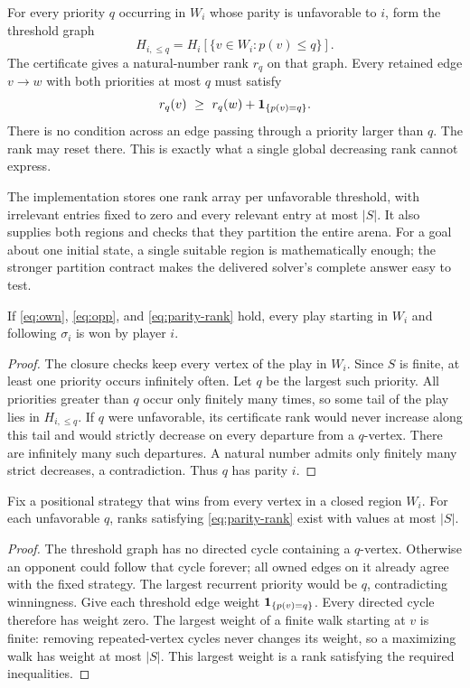 For every priority $q$ occurring in $W_i$ whose parity is unfavorable to $i$,
form the threshold graph
\[
 H_{i,\le q}=H_i[\{v\in W_i:p(v)\le q\}].
\]
The certificate gives a natural-number rank $r_q$ on that graph. Every retained
edge $v\to w$ with both priorities at most $q$ must satisfy
\begin{equation}
 r_q(v)\ \ge\ r_q(w)+\one{p(v)=q}.
 \label{eq:parity-rank}
\end{equation}
There is no condition across an edge passing through a priority larger than
$q$. The rank may reset there. This is exactly what a single global decreasing
rank cannot express.

The implementation stores one rank array per unfavorable threshold, with
irrelevant entries fixed to zero and every relevant entry at most $|S|$. It
also supplies both regions and checks that they partition the entire arena.
For a goal about one initial state, a single suitable region is mathematically
enough; the stronger partition contract makes the delivered solver's complete
answer easy to test.

\begin{theorem}
\label{thm:parity}
If \eqref{eq:own}, \eqref{eq:opp}, and \eqref{eq:parity-rank} hold, every play
starting in $W_i$ and following $\sigma_i$ is won by player $i$.
\end{theorem}
\begin{proof}
The closure checks keep every vertex of the play in $W_i$. Since $S$ is finite,
at least one priority occurs infinitely often. Let $q$ be the largest such
priority. All priorities greater than $q$ occur only finitely many times, so
some tail of the play lies in $H_{i,\le q}$. If $q$ were unfavorable, its
certificate rank would never increase along this tail and would strictly
decrease on every departure from a $q$-vertex. There are infinitely many such
departures. A natural number admits only finitely many strict decreases, a
contradiction. Thus $q$ has parity $i$.
\end{proof}

\begin{proposition}
\label{prop:rank-complete}
Fix a positional strategy that wins from every vertex in a closed region $W_i$.
For each unfavorable $q$, ranks satisfying \eqref{eq:parity-rank} exist with
values at most $|S|$.
\end{proposition}
\begin{proof}
The threshold graph has no directed cycle containing a $q$-vertex. Otherwise
an opponent could follow that cycle forever; all owned edges on it already
agree with the fixed strategy. The largest recurrent priority would be $q$,
contradicting winningness. Give each threshold edge weight
$\mathbf{1}_{\{p(v)=q\}}$. Every directed cycle therefore has weight zero. The largest
weight of a finite walk starting at $v$ is finite: removing repeated-vertex
cycles never changes its weight, so a maximizing walk has weight at most
$|S|$. This largest weight is a rank satisfying the required inequalities.
\end{proof}

